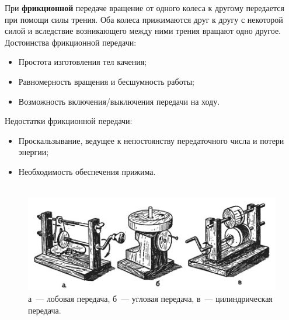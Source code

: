 При {\bfseries фрикционной} передаче вращение от одного колеса к другому передается при помощи силы трения. Оба колеса прижимаются друг к другу с некоторой силой и вследствие возникающего между ними трения вращают одно другое.\\
Достоинства фрикционной передачи:

\begin{itemize}
	\item Простота изготовления тел качения;	
	\item Равномерность вращения и бесшумность работы;
	\item Возможность включения/выключения передачи на ходу.\\
\end{itemize}
Недостатки фрикционной передачи:

\begin{itemize}
	\item Проскальзывание, ведущее к непостоянству передаточного числа и потери энергии;
	
	\item Необходимость обеспечения прижима.\\\\
\end{itemize}
\begin{figure}[h!]
	\begin{center}
		\includegraphics[width=1\linewidth]{chapters/chapter5/images/3}
		\caption{а~--- лобовая передача, б~--- угловая передача, в~--- цилиндрическая передача.}
		\label{ris:image5x2}
	\end{center}
\end{figure}
\clearpage
